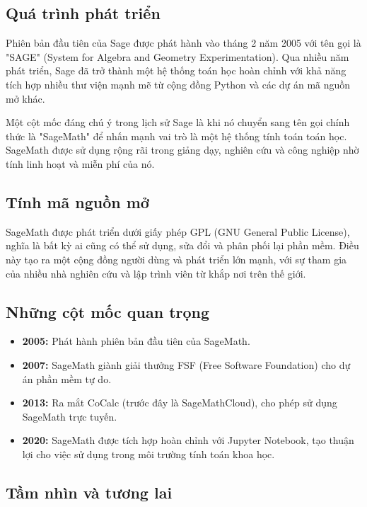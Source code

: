 \subsection{Quá trình phát triển}

Phiên bản đầu tiên của Sage được phát hành vào tháng 2 năm 2005 với tên gọi là "SAGE" (System for Algebra and Geometry Experimentation). Qua nhiều năm phát triển, Sage đã trở thành một hệ thống toán học hoàn chỉnh với khả năng tích hợp nhiều thư viện mạnh mẽ từ cộng đồng Python và các dự án mã nguồn mở khác.

Một cột mốc đáng chú ý trong lịch sử Sage là khi nó chuyển sang tên gọi chính thức là "SageMath" để nhấn mạnh vai trò là một hệ thống tính toán toán học. SageMath được sử dụng rộng rãi trong giảng dạy, nghiên cứu và công nghiệp nhờ tính linh hoạt và miễn phí của nó.

\subsection{Tính mã nguồn mở}

SageMath được phát triển dưới giấy phép GPL (GNU General Public License), nghĩa là bất kỳ ai cũng có thể sử dụng, sửa đổi và phân phối lại phần mềm. Điều này tạo ra một cộng đồng người dùng và phát triển lớn mạnh, với sự tham gia của nhiều nhà nghiên cứu và lập trình viên từ khắp nơi trên thế giới.

\subsection{Những cột mốc quan trọng}

\begin{itemize}
	\item \textbf{2005:} Phát hành phiên bản đầu tiên của SageMath.
	\item \textbf{2007:} SageMath giành giải thưởng FSF (Free Software Foundation) cho dự án phần mềm tự do.
	\item \textbf{2013:} Ra mắt CoCalc (trước đây là SageMathCloud), cho phép sử dụng SageMath trực tuyến.
	\item \textbf{2020:} SageMath được tích hợp hoàn chỉnh với Jupyter Notebook, tạo thuận lợi cho việc sử dụng trong môi trường tính toán khoa học.
\end{itemize}

\subsection{Tầm nhìn và tương lai}

